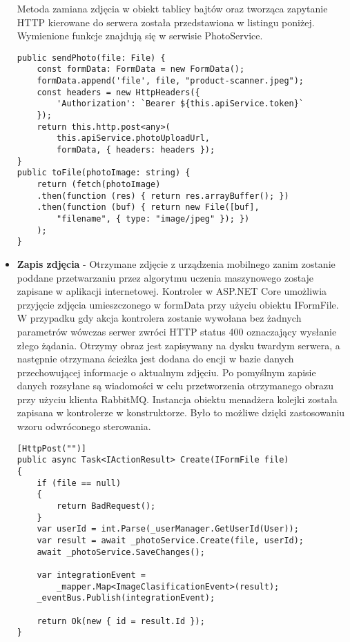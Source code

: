 \begin{itemize}
Metoda zamiana zdjęcia w obiekt tablicy bajtów oraz tworząca zapytanie HTTP kierowane do serwera została przedstawiona w listingu poniżej. Wymienione funkcje znajdują się w serwisie PhotoService.

\begin{lstlisting}[caption=Zamiana base64 na tablicę bajtów oraz przesłanie zdjecia przy użyciu obiektu form data.]
public sendPhoto(file: File) {
	const formData: FormData = new FormData();
	formData.append('file', file, "product-scanner.jpeg");
	const headers = new HttpHeaders({
		'Authorization': `Bearer ${this.apiService.token}`
	});
	return this.http.post<any>(
		this.apiService.photoUploadUrl, 
		formData, { headers: headers });
}
public toFile(photoImage: string) {
	return (fetch(photoImage)
	.then(function (res) { return res.arrayBuffer(); })
	.then(function (buf) { return new File([buf], 
		"filename", { type: "image/jpeg" }); })
	);
}
\end{lstlisting} 
\item \textbf{Zapis zdjęcia} - Otrzymane zdjęcie z urządzenia mobilnego zanim zostanie poddane przetwarzaniu przez algorytmu uczenia maszynowego zostaje zapisane w aplikacji internetowej. Kontroler w ASP.NET Core umożliwia przyjęcie zdjęcia umieszczonego w formData przy użyciu obiektu IFormFile. W przypadku gdy akcja kontrolera zostanie wywołana bez żadnych parametrów wówczas serwer zwróci HTTP status 400 oznaczający wysłanie złego żądania. Otrzymy obraz jest zapisywany na dysku twardym serwera, a następnie otrzymana ścieżka jest dodana do encji w bazie danych przechowującej informacje o aktualnym zdjęciu. Po pomyślnym zapisie danych rozsyłane są wiadomości w celu przetworzenia otrzymanego obrazu przy użyciu klienta RabbitMQ. Instancja obiektu menadżera kolejki została zapisana w kontrolerze w konstruktorze. Było to możliwe dzięki zastosowaniu wzoru odwróconego sterowania.

\begin{lstlisting}[caption=Akcja zapisu zdjęcia.]
[HttpPost("")]
public async Task<IActionResult> Create(IFormFile file)
{
	if (file == null)
	{
		return BadRequest();
	}
	var userId = int.Parse(_userManager.GetUserId(User));
	var result = await _photoService.Create(file, userId);
	await _photoService.SaveChanges();
	
	var integrationEvent = 
		_mapper.Map<ImageClasificationEvent>(result);
	_eventBus.Publish(integrationEvent);
	
	return Ok(new { id = result.Id });
}
\end{lstlisting} 


\end{itemize}
